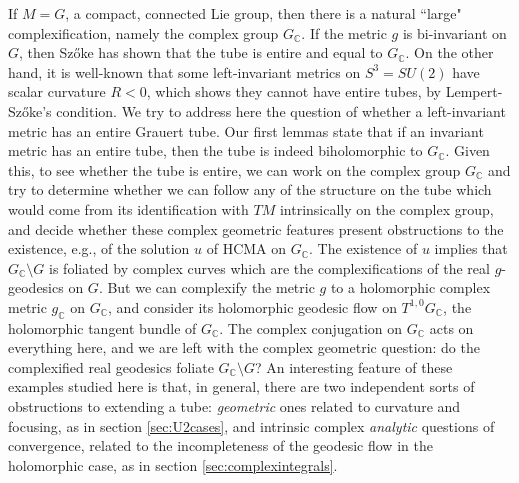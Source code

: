\documentclass[12pt,reqno]{amsart}\usepackage{amssymb,amsmath,amscd,epsfig,amsthm,enumerate,import,eufrak}
\theoremstyle{definition}
\theoremstyle{remark}
\numberwithin{equation}{section}
\theoremstyle{plain}
\theoremstyle{definition}
\def \c {\mathbb{C}}
\def \vs {\vskip 2mm}
\theoremstyle{remark}
\numberwithin{theorem}{section}
\begin{document}
If $M = G$, a compact, connected Lie group, then there is a natural ``large" complexification, namely the complex group $G_{\c}$. If the metric $g$ is bi-invariant on $G$, then Sz\H{o}ke \cite{s} has shown that the tube is entire and equal to $G_{\c}$. On the other hand, it is well-known that some left-invariant metrics on $S^3 = SU(2)$ have scalar curvature $R < 0$, which shows they cannot have entire tubes, by Lempert-Sz\H{o}ke's condition. We try to address here the question of whether a left-invariant metric has an entire Grauert tube. Our first lemmas state that if an invariant metric has an entire tube, then the tube is indeed biholomorphic to $G_{\c}$. Given this, to see whether the tube is entire, we can work on the complex group $G_{\c}$ and try to determine whether we can follow any of the structure on the tube which would come from its identification with $TM$ intrinsically on the complex group, and  decide whether these complex geometric features present obstructions to the existence, e.g., of the solution $u$ of HCMA on $G_{\c}$. The existence of $u$ implies that $G_{\c} \setminus G$ is foliated by complex curves which are the complexifications of the real $g$-geodesics on $G$. But we can complexify the metric $g$ to a holomorphic complex metric $g_{\c}$ on $G_{\c}$, and consider its holomorphic geodesic flow on $T^{1,0}G_{\c}$, the holomorphic tangent bundle of $G_{\c}$. The complex conjugation on $G_{\c}$ acts on everything here, and we are left with the complex geometric question: do the complexified real geodesics foliate $G_{\c} \setminus G$? An interesting feature of these examples studied here is that, in general, there are two independent sorts of obstructions to extending a tube: {\em geometric} ones related to curvature and focusing, as in section \ref{sec:U2cases}, and intrinsic complex {\em analytic} questions of convergence, related to the incompleteness of the geodesic flow in the holomorphic case, as in section \ref{sec:complexintegrals}. 
\vs
\end{document}
